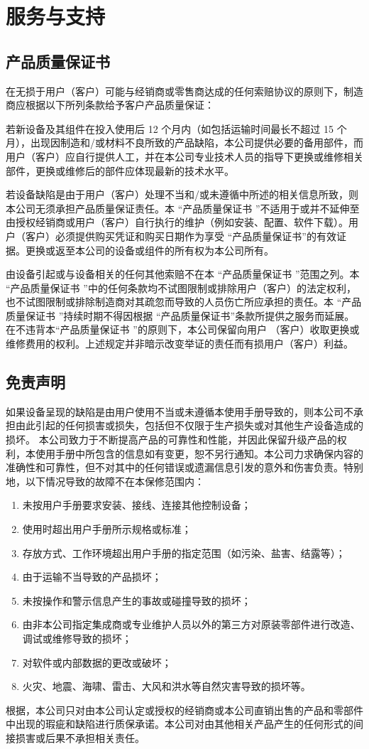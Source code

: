 \chapter{服务与支持}

\section{产品质量保证书}
\label{sec:产品质量保证书}
在无损于用户（客户）可能与经销商或零售商达成的任何索赔协议的原则下，制造商应根据以下所列条款给予客户产品质量保证：

若新设备及其组件在投入使用后 12 个月内（如包括运输时间最长不超过 15 个月），出现因制造和/或材料不良所致的产品缺陷，本公司提供必要的备用部件，而用户（客户）应自行提供人工，并在本公司专业技术人员的指导下更换或维修相关部件，更换或维修后的部件应体现最新的技术水平。

若设备缺陷是由于用户（客户）处理不当和/或未遵循{\ThisBook}中所述的相关信息所致，则本公司无须承担产品质量保证责任。本 “产品质量保证书 ”不适用于或并不延伸至由授权经销商或用户（客户）自行执行的维护（例如安装、配置、软件下载）。用户（客户）必须提供购买凭证和购买日期作为享受 “产品质量保证书”的有效证据。更换或返至本公司的设备或组件的所有权为本公司所有。

由设备引起或与设备相关的任何其他索赔不在本 “产品质量保证书 ”范围之列。本 “产品质量保证书 ”中的任何条款均不试图限制或排除用户（客户）的法定权利，也不试图限制或排除制造商对其疏忽而导致的人员伤亡所应承担的责任。本 “产品质量保证书 ”持续时期不得因根据 “产品质量保证书”条款所提供之服务而延展。在不违背本“产品质量保证书 ”的原则下，本公司保留向用户 （客户）收取更换或维修费用的权利。上述规定并非暗示改变举证的责任而有损用户（客户）利益。

\section{免责声明}
如果设备呈现的缺陷是由用户使用不当或未遵循本使用手册导致的，则本公司不承担由此引起的任何损害或损失，包括但不仅限于生产损失或对其他生产设备造成的损坏。
本公司致力于不断提高产品的可靠性和性能，并因此保留升级产品的权利，本使用手册中所包含的信息如有变更，恕不另行通知。本公司力求确保{\ThisBook}内容的准确性和可靠性，但不对其中的任何错误或遗漏信息引发的意外和伤害负责。特别地，以下情况导致的故障不在本保修范围内：
\begin{enumerate}
\item 未按用户手册要求安装、接线、连接其他控制设备；
\item 使用时超出用户手册所示规格或标准；
\item 存放方式、工作环境超出用户手册的指定范围（如污染、盐害、结露等）；
\item 由于运输不当导致的产品损坏；
\item 未按操作和警示信息产生的事故或碰撞导致的损坏；
\item 由非本公司指定集成商或专业维护人员以外的第三方对原装零部件进行改造、调试或维修导致的损坏；
\item 对软件或内部数据的更改或破坏；
\item 火灾、地震、海啸、雷击、大风和洪水等自然灾害导致的损坏等。
\end{enumerate}

根据，本公司只对由本公司认定或授权的经销商或本公司直销出售的产品和零部件中出现的瑕疵和缺陷进行质保承诺。本公司对由其他相关产品产生的任何形式的间接损害或后果不承担相关责任。
